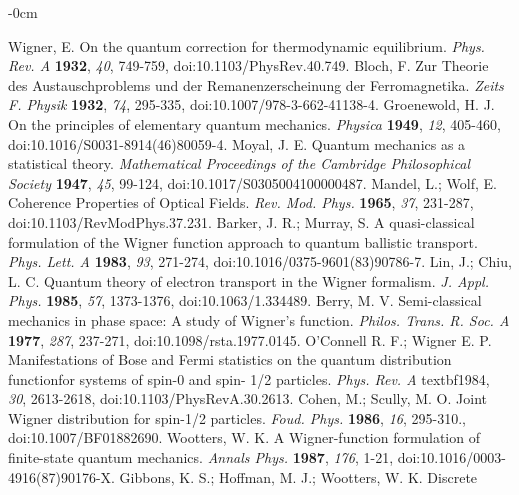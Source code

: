 \documentclass[quantumrep,article,submit,pdftex,moreauthors]{Definitions/mdpi}
\providecommand{\DIFadd}[1]{{\protect\color{blue}\uwave{#1}}} %
\providecommand{\DIFaddbegin}{} %
\providecommand{\DIFaddend}{} %
\begin{document}
\begin{adjustwidth}{-\extralength}{0cm}
\begin{thebibliography}{999}
 Wigner, E. On the quantum correction for thermodynamic
equilibrium. \textit{Phys. Rev. A} \textbf{1932}, \textit{40}, 749-759,
doi:10.1103/PhysRev.40.749.
 Bloch, F. Zur Theorie des Austauschproblems und der
Remanenzerscheinung der Ferromagnetika. \textit{Zeits F. Physik} \textbf{1932},
\textit{74}, 295-335, doi:10.1007/978-3-662-41138-4.
 Groenewold, H. J. On the principles of elementary
quantum mechanics. \textit{Physica} \textbf{1949}, \textit{12}, 405-460,
doi:10.1016/S0031-8914(46)80059-4.
 Moyal, J. E. Quantum mechanics as a statistical theory. 
\textit{Mathematical Proceedings of the Cambridge Philosophical Society} 
\textbf{1947}, \textit{45}, 99-124, doi:10.1017/S0305004100000487.
 Mandel, L.; Wolf, E. Coherence Properties of Optical
Fields. \textit{Rev. Mod. Phys.} \textbf{1965}, \textit{37}, 231-287,
doi:10.1103/RevModPhys.37.231.
 Barker, J. R.; Murray, S. A quasi-classical formulation
of the Wigner function approach to quantum ballistic transport. \textit{Phys.
Lett. A} \textbf{1983}, \textit{93}, 271-274, doi:10.1016/0375-9601(83)90786-7.
 Lin, J.; Chiu, L. C. Quantum theory of electron
transport in the Wigner formalism. \textit{J. Appl. Phys.} \textbf{1985}, 
\textit{57}, 1373-1376, doi:10.1063/1.334489.
 Berry, M. V. Semi-classical mechanics in phase space: A
study of Wigner's function. \textit{Philos. Trans. R. Soc. A} \textbf{1977}, 
\textit{287}, 237-271, doi:10.1098/rsta.1977.0145.
 O'Connell R. F.; Wigner E. P. Manifestations of Bose and
Fermi statistics on the quantum distribution functionfor systems of spin-0
and spin- 1/2 particles. \textit{Phys. Rev. A} \DIFaddbegin \DIFadd{\ }\DIFaddend textbf{1984}, \textit{30},
2613-2618, doi:10.1103/PhysRevA.30.2613.
 Cohen, M.; Scully, M. O. Joint Wigner distribution for
spin-1/2 particles. \textit{Foud. Phys.} \textbf{1986}, \textit{16},
295-310., doi:10.1007/BF01882690.
 Wootters, W. K. A Wigner-function formulation of
finite-state quantum mechanics. \textit{Annals Phys.} \textbf{1987},
\textit{176}, 1-21, doi:10.1016/0003-4916(87)90176-X.
 Gibbons, K. S.; Hoffman, M. J.; Wootters, W. K. Discrete

\end{thebibliography}
\end{adjustwidth}
\end{document}
